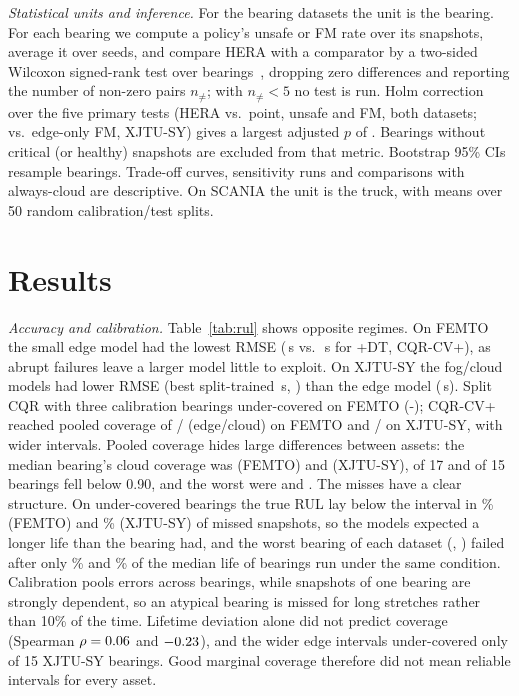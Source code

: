 \documentclass[conference]{IEEEtran}
\begin{document}
\textit{Statistical units and inference.} For the bearing datasets the unit is the bearing. For each bearing we compute a policy's unsafe or FM rate over its snapshots, average it over seeds, and compare HERA with a comparator by a two-sided Wilcoxon signed-rank test over bearings~\cite{demsar2006statistical}, dropping zero differences and reporting the number of non-zero pairs $n_{\neq}$; with $n_{\neq}<5$ no test is run. Holm correction over the five primary tests (HERA vs.\ point, unsafe and FM, both datasets; vs.\ edge-only FM, XJTU-SY) gives a largest adjusted $p$ of \holmMaxP. Bearings without critical (or healthy) snapshots are excluded from that metric. Bootstrap 95\% CIs resample bearings. Trade-off curves, sensitivity runs and comparisons with always-cloud are descriptive. On SCANIA the unit is the truck, with means over 50 random calibration/test splits.

\section{Results}\label{sec:results}
\textit{Accuracy and calibration.} Table~\ref{tab:rul} shows opposite regimes. On FEMTO the small edge model had the lowest RMSE (\feRmseEdge\,s vs.\ \feRmseCloud\,s for \feCloudModel+DT, CQR-CV+), as abrupt failures leave a larger model little to exploit. On XJTU-SY the fog/cloud models had lower RMSE (best split-trained \xjBestCloudRmse\,s, \xjBestCloudModel) than the edge model (\xjRmseEdgeSplit\,s). Split CQR with three calibration bearings under-covered on FEMTO (\feSplitCovMin-\feSplitCovMax); CQR-CV+ reached pooled coverage of \fePicpEdge{}/\fePicpCloud{} (edge/cloud) on FEMTO and \xjPicpEdge{}/\xjPicpCloud{} on XJTU-SY, with wider intervals. Pooled coverage hides large differences between assets: the median bearing's cloud coverage was \fePbCovMed{} (FEMTO) and \xjPbCovMed{} (XJTU-SY), \fePbCovLow{} of 17 and \xjPbCovLow{} of 15 bearings fell below 0.90, and the worst were \fePbCovMin{} and \xjPbCovMin. The misses have a clear structure. On under-covered bearings the true RUL lay below the interval in \feCovBelow\% (FEMTO) and \xjCovBelow\% (XJTU-SY) of missed snapshots, so the models expected a longer life than the bearing had, and the worst bearing of each dataset (\feCovWorst, \xjCovWorst) failed after only \feCovWorstLife\% and \xjCovWorstLife\% of the median life of bearings run under the same condition. Calibration pools errors across bearings, while snapshots of one bearing are strongly dependent, so an atypical bearing is missed for long stretches rather than 10\% of the time. Lifetime deviation alone did not predict coverage (Spearman $\rho=0.06$ and $-0.23$), and the wider edge intervals under-covered only \xjCovEdgeLow{} of 15 XJTU-SY bearings. Good marginal coverage therefore did not mean reliable intervals for every asset.
\end{document}
